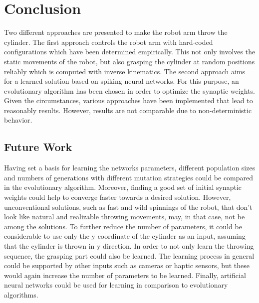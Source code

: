 \section{Conclusion}
\label{sec:conclusion}
\todo{}
Two different approaches are presented to make the robot arm throw the cylinder.
The first approach controls the robot arm with hard-coded configurations which have been determined empirically.
This not only involves the static movements of the robot, but also grasping the cylinder at random positions reliably which is computed with inverse kinematics.
The second approach aims for a learned solution based on spiking neural networks.
For this purpose, an evolutionary algorithm has been chosen in order to optimize the synaptic weights.
Given the circumstances, various approaches have been implemented that lead to reasonably results.
However, results are not comparable due to non-deterministic behavior.

\subsection{Future Work} %
\label{sub:future_work}
\todo{}
Having set a basis for learning the networks parameters, different population sizes and numbers of generations with different mutation strategies could be compared in the evolutionary algorithm.
Moreover, finding a good set of initial synaptic weights could help to converge faster towards a desired solution.
However, unconventional solutions, such as fast and wild spinnings of the robot, that don't look like natural and realizable throwing movements, may, in that case, not be among the solutions.
To further reduce the number of parameters, it could be considerable to use only the y coordinate of the cylinder as an input, assuming that the cylinder is thrown in y direction.
In order to not only learn the throwing sequence, the grasping part could also be learned.
The learning process in general could be supported by other inputs such as cameras or haptic sensors, but these would again increase the number of parameters to be learned.
Finally, artificial neural networks could be used for learning in comparison to evolutionary algorithms.

